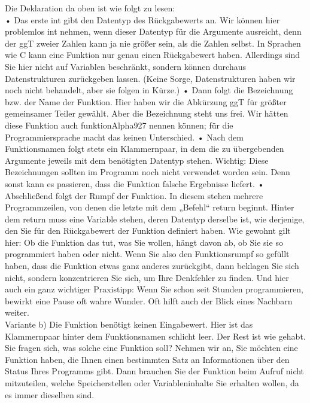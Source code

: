 Die Deklaration da oben ist wie folgt zu lesen:\\

•	Das erste int gibt den Datentyp des Rückgabewerts an. Wir können hier problemlos int nehmen, wenn dieser Datentyp für die Argumente ausreicht, denn der ggT zweier Zahlen kann ja nie größer sein, als die Zahlen selbst. In Sprachen wie C kann eine Funktion nur genau einen Rückgabewert haben. Allerdings sind Sie hier nicht auf Variablen beschränkt, sondern können durchaus Datenstrukturen zurückgeben lassen. (Keine Sorge, Datenstrukturen haben wir noch nicht behandelt, aber sie folgen in Kürze.)
•	Dann folgt die Bezeichnung  bzw. der Name der Funktion. Hier haben wir die Abkürzung ggT für größter gemeinsamer Teiler gewählt. Aber die Bezeichnung steht uns frei. Wir hätten diese Funktion auch funktionAlpha927 nennen können; für die Programmiersprache macht das keinen Unterschied.
•	Nach dem Funktionsnamen folgt stets ein Klammernpaar, in dem die zu übergebenden Argumente jeweils mit dem benötigten Datentyp stehen. Wichtig: Diese Bezeichnungen sollten im Programm noch nicht verwendet worden sein. Denn sonst kann es passieren, dass die Funktion falsche Ergebnisse liefert.
•	Abschließend folgt der Rumpf der Funktion. In diesem stehen mehrere Programmzeilen, von denen die letzte mit dem „Befehl“ return beginnt. Hinter dem return muss eine Variable stehen, deren Datentyp derselbe ist, wie derjenige, den Sie für den Rückgabewert der Funktion definiert haben. Wie gewohnt gilt hier: Ob die Funktion das tut, was Sie wollen, hängt davon ab, ob Sie sie so programmiert haben oder nicht. Wenn Sie also den Funktionsrumpf so gefüllt haben, dass die Funktion etwas ganz anderes zurückgibt, dann beklagen Sie sich nicht, sondern konzentrieren Sie sich, um Ihre Denkfehler zu finden. Und hier auch ein ganz wichtiger Praxistipp: Wenn Sie schon seit Stunden programmieren, bewirkt eine Pause oft wahre Wunder. Oft hilft auch der Blick eines Nachbarn weiter.\\

Variante b) Die Funktion benötigt keinen Eingabewert. Hier ist das Klammernpaar hinter dem Funktionsnamen schlicht leer. Der Rest ist wie gehabt. Sie fragen sich, was solche eine Funktion soll? Nehmen wir an, Sie möchten eine Funktion haben, die Ihnen einen bestimmten Satz an Informationen über den Status Ihres Programms gibt. Dann brauchen Sie der Funktion beim Aufruf nicht mitzuteilen, welche Speicherstellen oder Variableninhalte Sie erhalten wollen, da es immer dieselben sind.\\

